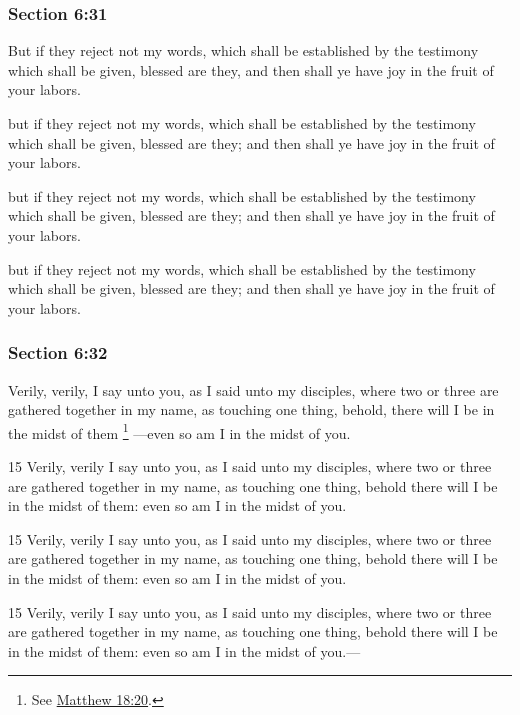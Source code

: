 	\subsubsection{Section 6:31} %
		\label{DC6-31}

		But if they reject not my words, which shall be established by the testimony which shall be given, blessed are they, and then shall ye have joy in the fruit of your labors.

		\begin{framed}
		\scriptsize
			\begin{compactdesc}
				\item[JSP] but if they reject not my words, which shall be established by the testimony which shall be given, blessed are they; and then shall ye have joy in the fruit of your labors.
				\item[DC 1835] but if they reject not my words, which shall be established by the testimony which shall be given, blessed are they; and then shall ye have joy in the fruit of your labors.
				\item[DC 1844] but if they reject not my words, which shall be established by the testimony which shall be given, blessed are they; and then shall ye have joy in the fruit of your labors.
			\end{compactdesc}
		\end{framed}

	\subsubsection{Section 6:32} %
		\label{DC6-32}

		Verily, verily, I say unto you, as I said unto my disciples, where two or three are gathered together in my name, as touching one thing, behold, there will I be in the midst of them%
			\footnote{%
				See \hyperref[MATTHEW-18-20]{Matthew 18:20}.
				}%
		---even so am I in the midst of you.

		\begin{framed}
		\scriptsize
			\begin{compactdesc}
				\item[JSP] 15 Verily, verily I say unto you, as I said unto my disciples, where two or three are gathered together in my name, as touching one thing, behold there will I be in the midst of them: even so am I in the midst of you.
				\item[DC 1835] 15 Verily, verily I say unto you, as I said unto my disciples, where two or three are gathered together in my name, as touching one thing, behold there will I be in the midst of them: even so am I in the midst of you.
				\item[DC 1844] 15 Verily, verily I say unto you, as I said unto my disciples, where two or three are gathered together in my name, as touching one thing, behold there will I be in the midst of them: even so am I in the midst of you.---
			\end{compactdesc}
		\end{framed}

